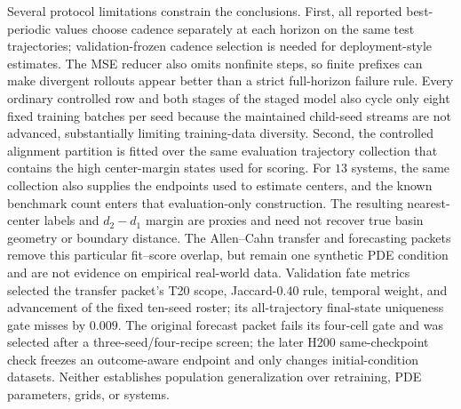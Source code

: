 \documentclass[11pt]{article}
\begin{document}
Several protocol limitations constrain the conclusions. First, all reported best-periodic values choose cadence separately at each horizon on the same test trajectories; validation-frozen cadence selection is needed for deployment-style estimates. The MSE reducer also omits nonfinite steps, so finite prefixes can make divergent rollouts appear better than a strict full-horizon failure rule. Every ordinary controlled row and both stages of the staged model also cycle only eight fixed training batches per seed because the maintained child-seed streams are not advanced, substantially limiting training-data diversity. Second, the controlled alignment partition is fitted over the same evaluation trajectory collection that contains the high center-margin states used for scoring. For \(13\) systems, the same collection also supplies the endpoints used to estimate centers, and the known benchmark count enters that evaluation-only construction. The resulting nearest-center labels and \(d_2-d_1\) margin are proxies and need not recover true basin geometry or boundary distance. The Allen--Cahn transfer and forecasting packets remove this particular fit--score overlap, but remain one synthetic PDE condition and are not evidence on empirical real-world data. Validation fate metrics selected the transfer packet's T20 scope, Jaccard-0.40 rule, temporal weight, and advancement of the fixed ten-seed roster; its all-trajectory final-state uniqueness gate misses by \(0.009\). The original forecast packet fails its four-cell gate and was selected after a three-seed/four-recipe screen; the later H200 same-checkpoint check freezes an outcome-aware endpoint and only changes initial-condition datasets. Neither establishes population generalization over retraining, PDE parameters, grids, or systems.
\end{document}
